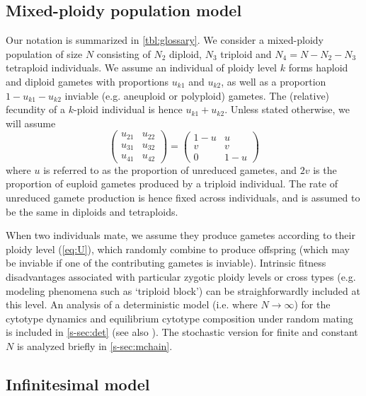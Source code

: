 \documentclass[12pt,a4paper]{article}
\begin{document}
\subsection*{Mixed-ploidy population model}

Our notation is summarized in \cref{tbl:glossary}.
We consider a mixed-ploidy population of size $N$ consisting of $N_2$ diploid,
$N_3$ triploid and $N_4=N-N_2-N_3$ tetraploid individuals.
We assume an individual of ploidy level $k$ forms haploid and diploid gametes
with proportions $u_{k1}$ and $u_{k2}$, as well as a proportion
$1-u_{k1}-u_{k2}$ inviable (e.g. aneuploid or polyploid) gametes.
The (relative) fecundity of a $k$-ploid individual is hence $u_{k1} + u_{k2}$.
Unless stated otherwise, we will assume 
\begin{equation}
    \begin{pmatrix} 
    u_{21} & u_{22} \\ 
    u_{31} & u_{32} \\ 
    u_{41} & u_{42} 
    \end{pmatrix} =
    \begin{pmatrix} 
    1-u & u \\
    v & v \\
    0 & 1-u
    \end{pmatrix} \label{eq:U}
\end{equation}
where $u$ is referred to as the proportion of unreduced gametes, and $2v$ is
the proportion of euploid gametes produced by a triploid individual.
The rate of unreduced gamete production is hence fixed across individuals, and
is assumed to be the same in diploids and tetraploids.

When two individuals mate, we assume they produce gametes according to their
ploidy level (\cref{eq:U}), which randomly combine to produce offspring (which
may be inviable if one of the contributing gametes is inviable).
Intrinsic fitness disadvantages associated with particular zygotic ploidy
levels or cross types (e.g. modeling phenomena such as `triploid block') can be
straighforwardly included at this level.
An analysis of a deterministic model (i.e. where $N \rightarrow \infty$) for
the cytotype dynamics and equilibrium cytotype composition under random mating
is included in \cref{s-sec:det} (see also \cite{felber1997,kauai2024}).
The stochastic version for finite and constant $N$ is analyzed briefly in
\cref{s-sec:mchain}.

\subsection*{Infinitesimal model}
\end{document}
